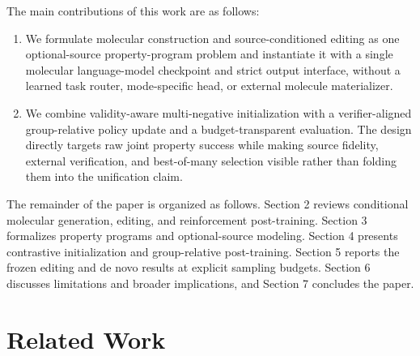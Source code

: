 \documentclass{article}
\begin{document}
The main contributions of this work are as follows:
\begin{enumerate}
  \item We formulate molecular construction and source-conditioned editing as
  one optional-source property-program problem and instantiate it with a single
  molecular language-model checkpoint and strict output interface, without a
  learned task router, mode-specific head, or external molecule materializer.
  \item We combine validity-aware multi-negative initialization with a
  verifier-aligned group-relative policy update and a budget-transparent
  evaluation. The design directly targets raw joint property success while
  making source fidelity, external verification, and best-of-many selection
  visible rather than folding them into the unification claim.
\end{enumerate}

The remainder of the paper is organized as follows. Section 2 reviews
conditional molecular generation, editing, and reinforcement post-training.
Section 3 formalizes property programs and optional-source modeling. Section 4
presents contrastive initialization and group-relative post-training. Section 5
reports the frozen editing and de novo results at explicit sampling budgets.
Section 6 discusses limitations and broader
implications, and Section 7 concludes the paper.

\section{Related Work}
\end{document}
